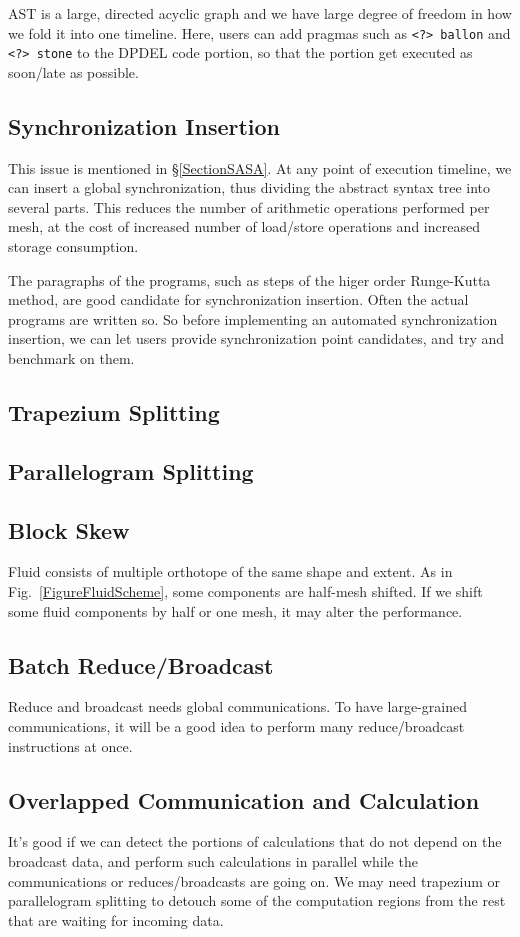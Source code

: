 \documentclass[twocolumn]{article}
\begin{document}
AST is a large, directed acyclic graph and we have large degree of freedom in
how we fold it into one timeline. Here, users can add pragmas such as {\tt <?>
  ballon} and {\tt <?> stone} to the DPDEL code portion, so that the portion
get executed as soon/late as possible.

\subsection{Synchronization Insertion}

This issue is mentioned in \S\ref{SectionSASA}.  At any point of execution
timeline, we can insert a global synchronization, thus dividing the abstract
syntax tree into several parts. This reduces the number of arithmetic
operations performed per mesh, at the cost of increased number of load/store
operations and increased storage consumption.

The paragraphs of the programs, such as steps of the higer order Runge-Kutta
method, are good candidate for synchronization insertion. Often the actual
programs are written so. So before implementing an automated synchronization
insertion, we can let users provide synchronization point candidates, and try
and benchmark on them.

\subsection{Trapezium Splitting}



\subsection{Parallelogram Splitting}


\subsection{Block Skew}
Fluid consists of multiple orthotope of the same shape and extent. As in
Fig.~\ref{FigureFluidScheme}, some components are half-mesh shifted. If we
shift some fluid components by half or one mesh, it may alter the performance.



\subsection{Batch Reduce/Broadcast}
Reduce and broadcast needs global communications. To have large-grained
communications, it will be a good idea to perform many reduce/broadcast
instructions at once. 

\subsection{Overlapped Communication and Calculation}

It's good if we can detect the portions of calculations that do not depend on
the broadcast data, and perform such calculations in parallel while the
communications or reduces/broadcasts are going on. We may need trapezium or
parallelogram splitting to detouch some of the computation regions from the
rest that are waiting for incoming data.


\end{document}
